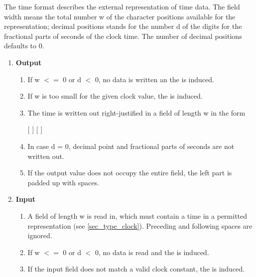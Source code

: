 The time format describes the external representation of time data. The
field width means the total number w of the character positions
available for the representation; decimal positions stands for the
number d of the digits for the fractional parts of seconds of the clock
time. 
The number of decimal positions defaults to 0.
\begin{enumerate}
\item {\bf Output}\\
\begin{enumerate}

\item If w $<=$ 0 or d $<$ 0, no data is written an the 
   is induced.

\item If w is too small for the given clock value, the 
   is induced.

\item The time is written out right-justified in a field of length w in the
form

[  ]  [  ]

\item 
In case d = 0,
decimal point and fractional parts of seconds are not written out.

\item If the output value does not occupy the entire field, the left part is
padded up with spaces.
\end{enumerate}

\item {\bf Input}\\
\begin{enumerate}
\item A field of length w is read in, which must contain a time in a permitted
representation (see \ref{sec_type_clock}). Preceding and following spaces are ignored.

\item If w $<=$ 0 or d $<$ 0, no data is read and the 
   is induced.

\item If the input field does not match a valid clock constant, the 
    is induced.


\end{enumerate}
\end{enumerate}
